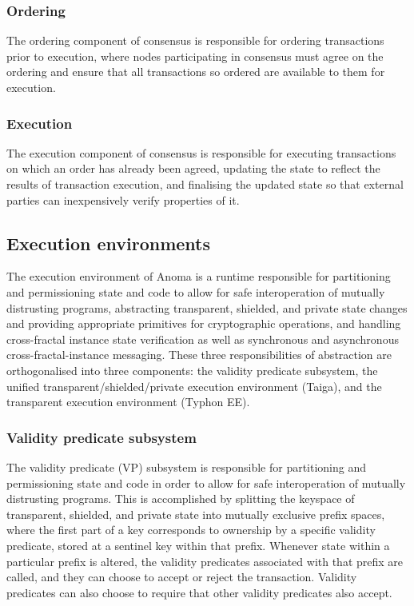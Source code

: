 \subsubsection{Ordering}\label{ordering}

The ordering component of consensus is responsible for ordering
transactions prior to execution, where nodes participating in consensus
must agree on the ordering and ensure that all transactions so ordered
are available to them for execution.

\subsubsection{Execution}\label{execution-1}

The execution component of consensus is responsible for executing
transactions on which an order has already been agreed, updating the
state to reflect the results of transaction execution, and finalising
the updated state so that external parties can inexpensively verify
properties of it.

\subsection{Execution environments}\label{execution-environments}

The execution environment of Anoma is a runtime responsible for
partitioning and permissioning state and code to allow for safe
interoperation of mutually distrusting programs, abstracting
transparent, shielded, and private state changes and providing
appropriate primitives for cryptographic operations, and handling
cross-fractal instance state verification as well as synchronous and
asynchronous cross-fractal-instance messaging. These three
responsibilities of abstraction are orthogonalised into three
components: the validity predicate subsystem, the unified
transparent/shielded/private execution environment (Taiga), and the
transparent execution environment (Typhon EE).

\subsubsection{Validity predicate
subsystem}\label{validity-predicate-subsystem}

The validity predicate (VP) subsystem is responsible for partitioning
and permissioning state and code in order to allow for safe
interoperation of mutually distrusting programs. This is accomplished by
splitting the keyspace of transparent, shielded, and private state into
mutually exclusive prefix spaces, where the first part of a key
corresponds to ownership by a specific validity predicate, stored at a
sentinel key within that prefix. Whenever state within a particular
prefix is altered, the validity predicates associated with that prefix
are called, and they can choose to accept or reject the transaction.
Validity predicates can also choose to require that other validity
predicates also accept.

